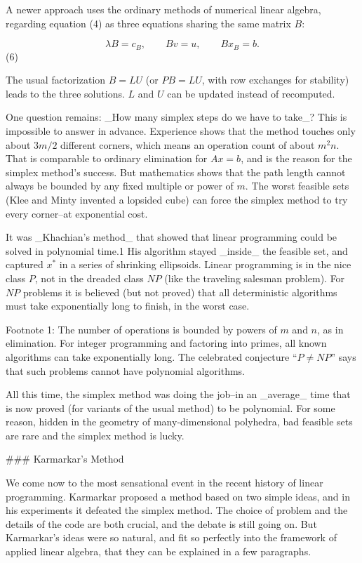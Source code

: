 A newer approach uses the ordinary methods of numerical linear algebra, regarding equation (4) as three equations sharing the same matrix \(B\):

\[\lambda B=c_{B},\qquad Bv=u,\qquad Bx_{B}=b.\] (6)

The usual factorization \(B=LU\) (or \(PB=LU\), with row exchanges for stability) leads to the three solutions. \(L\) and \(U\) can be updated instead of recomputed.

One question remains: _How many simplex steps do we have to take_? This is impossible to answer in advance. Experience shows that the method touches only about \(3m/2\) different corners, which means an operation count of about \(m^{2}n\). That is comparable to ordinary elimination for \(Ax=b\), and is the reason for the simplex method's success. But mathematics shows that the path length cannot always be bounded by any fixed multiple or power of \(m\). The worst feasible sets (Klee and Minty invented a lopsided cube) can force the simplex method to try every corner--at exponential cost.

It was _Khachian's method_ that showed that linear programming could be solved in polynomial time.1 His algorithm stayed _inside_ the feasible set, and captured \(x^{*}\) in a series of shrinking ellipsoids. Linear programming is in the nice class \(P\), not in the dreaded class \(NP\) (like the traveling salesman problem). For \(NP\) problems it is believed (but not proved) that all deterministic algorithms must take exponentially long to finish, in the worst case.

Footnote 1: The number of operations is bounded by powers of \(m\) and \(n\), as in elimination. For integer programming and factoring into primes, all known algorithms can take exponentially long. The celebrated conjecture “\(P\neq NP\)” says that such problems cannot have polynomial algorithms.

All this time, the simplex method was doing the job--in an _average_ time that is now proved (for variants of the usual method) to be polynomial. For some reason, hidden in the geometry of many-dimensional polyhedra, bad feasible sets are rare and the simplex method is lucky.

### Karmarkar's Method

We come now to the most sensational event in the recent history of linear programming. Karmarkar proposed a method based on two simple ideas, and in his experiments it defeated the simplex method. The choice of problem and the details of the code are both crucial, and the debate is still going on. But Karmarkar's ideas were so natural, and fit so perfectly into the framework of applied linear algebra, that they can be explained in a few paragraphs.


